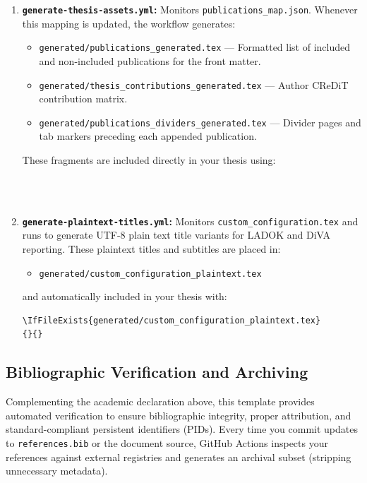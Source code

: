 \documentclass[12pt, twoside]{article}
\newcommand{\fname}[1]{\texttt{#1}}
\begin{document}
\begin{enumerate}
    \item \textbf{\fname{generate-thesis-assets.yml}:} Monitors \fname{publications\_map.json}. Whenever this mapping is updated, the workflow generates:
    \begin{itemize}
        \item \fname{generated/publications\_generated.tex} --- Formatted list of included and non-included publications for the front matter.
        \item \fname{generated/thesis\_contributions\_generated.tex} --- Author CReDiT contribution matrix.
        \item \fname{generated/publications\_dividers\_generated.tex} --- Divider pages and tab markers preceding each appended publication.
    \end{itemize}
    These fragments are included directly in your thesis using:
\begin{lstlisting}[style=latexExampleForAuthors]



\end{lstlisting}

    \item \textbf{\fname{generate-plaintext-titles.yml}:} Monitors \fname{custom\_configuration.tex} and runs \LuaLaTeX{} to generate UTF-8 plain text title variants for LADOK and DiVA reporting. These plaintext titles and subtitles are placed in:
    \begin{itemize}
        \item \fname{generated/custom\_configuration\_plaintext.tex}
    \end{itemize}
    and automatically included in your thesis with:
    \begin{lstlisting}[style=latexExampleForAuthors]
\IfFileExists{generated/custom_configuration_plaintext.tex}
{}{}
    \end{lstlisting}
\end{enumerate}

\subsection{Bibliographic Verification and Archiving}
\label{sec:UserBibManagement}

Complementing the academic declaration above, this template provides automated verification to ensure bibliographic integrity, proper attribution, and standard-compliant persistent identifiers (\glspl{PID}). Every time you commit updates to \fname{references.bib} or the document source, GitHub Actions inspects your references against external registries and generates an archival subset (stripping unnecessary metadata).
\end{document}
